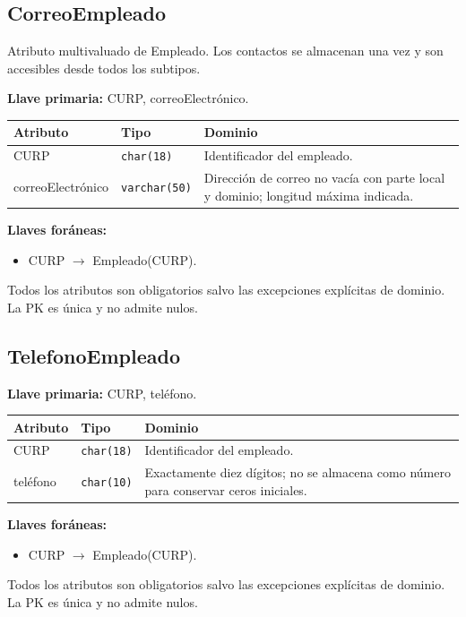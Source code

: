 \par\noindent\begin{minipage}{\textwidth}
\subsection{CorreoEmpleado}
Atributo multivaluado de Empleado. Los contactos se almacenan una vez y son accesibles desde todos los subtipos.\par
\textbf{Llave primaria:} CURP, correoElectrónico.\par
{\small\begin{tabular}{@{}p{}p{}p{}@{}}
\toprule Atributo & Tipo & Dominio \\ \midrule
CURP & \texttt{char(18)} & Identificador del empleado. \\
correoElectrónico & \texttt{varchar(50)} & Dirección de correo no vacía con parte local y dominio; longitud máxima indicada. \\
\bottomrule\end{tabular}}
\textbf{Llaves foráneas:}\begin{itemize}[nosep]
\item CURP $\rightarrow$ Empleado(CURP).
\end{itemize}
Todos los atributos son obligatorios salvo las excepciones explícitas de dominio. La PK es única y no admite nulos.
\end{minipage}\par\vspace{.35cm}
\par\noindent\begin{minipage}{\textwidth}
\subsection{TelefonoEmpleado}
\par
\textbf{Llave primaria:} CURP, teléfono.\par
{\small\begin{tabular}{@{}p{}p{}p{}@{}}
\toprule Atributo & Tipo & Dominio \\ \midrule
CURP & \texttt{char(18)} & Identificador del empleado. \\
teléfono & \texttt{char(10)} & Exactamente diez dígitos; no se almacena como número para conservar ceros iniciales. \\
\bottomrule\end{tabular}}
\textbf{Llaves foráneas:}\begin{itemize}[nosep]
\item CURP $\rightarrow$ Empleado(CURP).
\end{itemize}
Todos los atributos son obligatorios salvo las excepciones explícitas de dominio. La PK es única y no admite nulos.
\end{minipage}\par\vspace{.35cm}
